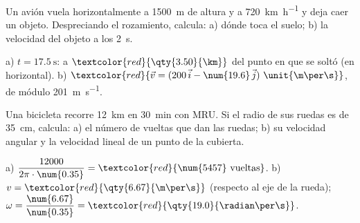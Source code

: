 \begin{exercise}
    Un avión vuela horizontalmente a \qty{1500}{\m} de altura y a \qty{720}{\km\per\hour} y deja caer un objeto. Despreciando el
    rozamiento, calcula: a) dónde toca el suelo; b) la velocidad del objeto a los \qty{2}{\s}.
    \begin{solu}
        a) \(t = \qty{17.5}{\s}\): a \(\textcolor{red}{\qty{3.50}{\km}}\) del punto en que se soltó (en horizontal).
        b) \(\textcolor{red}{\vec v = (200\,\ivec - \num{19.6}\,\jvec)~\unit{\m\per\s}}\), de módulo \qty{201}{\m\per\s}.
    \end{solu}
\end{exercise}

\begin{exercise}
    Una bicicleta recorre \qty{12}{\km} en \qty{30}{\minute} con MRU. Si el radio de sus ruedas es de \qty{35}{\cm}, calcula: a) el
    número de vueltas que dan las ruedas; b) su velocidad angular y la velocidad lineal de un punto de la cubierta.
    \begin{solu}
        a) \(\dfrac{12000}{2\pi \cdot \num{0.35}} = \textcolor{red}{\num{5457}~\text{vueltas}}\). b) \(v = \textcolor{red}{\qty{6.67}{\m\per\s}}\)
        (respecto al eje de la rueda); \(\omega = \dfrac{\num{6.67}}{\num{0.35}} = \textcolor{red}{\qty{19.0}{\radian\per\s}}\).
    \end{solu}
\end{exercise}
